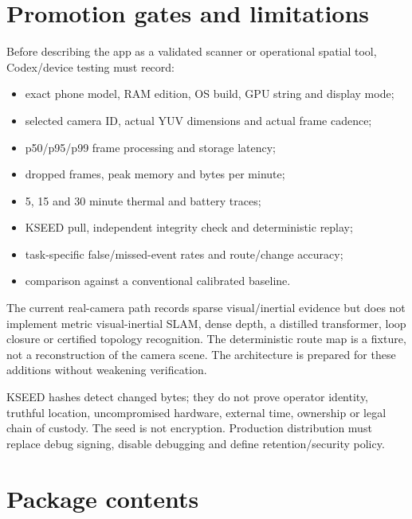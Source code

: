 \documentclass[10.5pt,a4paper]{article}
\begin{document}
\section{Promotion gates and limitations}

Before describing the app as a validated scanner or operational spatial tool, Codex/device testing must record:

\begin{itemize}
\item exact phone model, RAM edition, OS build, GPU string and display mode;
\item selected camera ID, actual YUV dimensions and actual frame cadence;
\item p50/p95/p99 frame processing and storage latency;
\item dropped frames, peak memory and bytes per minute;
\item 5, 15 and 30 minute thermal and battery traces;
\item KSEED pull, independent integrity check and deterministic replay;
\item task-specific false/missed-event rates and route/change accuracy;
\item comparison against a conventional calibrated baseline.
\end{itemize}

The current real-camera path records sparse visual/inertial evidence but does not implement metric visual-inertial SLAM, dense depth, a distilled transformer, loop closure or certified topology recognition. The deterministic route map is a fixture, not a reconstruction of the camera scene. The architecture is prepared for these additions without weakening verification.

KSEED hashes detect changed bytes; they do not prove operator identity, truthful location, uncompromised hardware, external time, ownership or legal chain of custody. The seed is not encryption. Production distribution must replace debug signing, disable debugging and define retention/security policy.

\section{Package contents}
\end{document}
